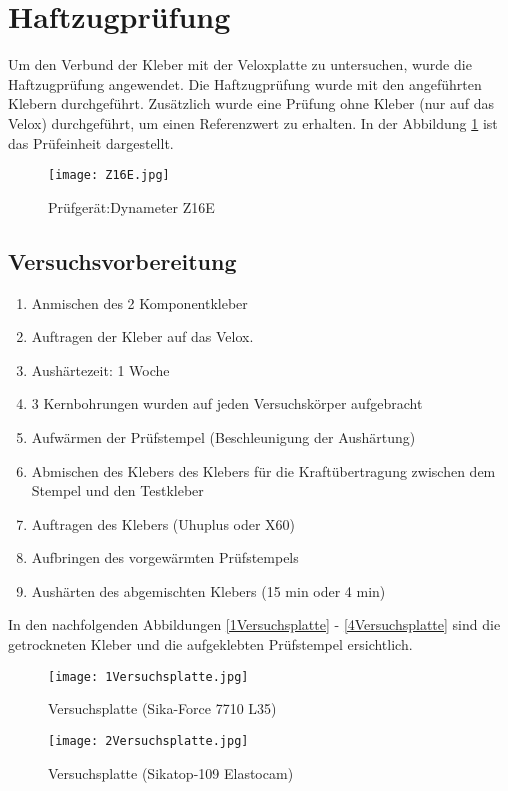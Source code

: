 \documentclass[12 pt,a4 paper ]{scrreprt}
\begin{document}
\section{Haftzugprüfung}
Um den Verbund der Kleber mit der Veloxplatte zu untersuchen, wurde die Haftzugprüfung angewendet.
Die Haftzugprüfung  wurde mit den angeführten Klebern durchgeführt. Zusätzlich wurde eine Prüfung ohne Kleber (nur auf das Velox) durchgeführt, um einen Referenzwert zu erhalten. In der Abbildung \ref{Z16E} ist das Prüfeinheit dargestellt.

\begin{figure}
\begin{center}
\texttt{[image: Z16E.jpg]}
\caption{ Prüfgerät:Dynameter Z16E}
\label{Z16E}
\end{center}
\end{figure}

\newpage{}

\subsection{Versuchsvorbereitung}

\begin{enumerate}
\item Anmischen des 2 Komponentkleber
\item Auftragen der Kleber auf das Velox.
\item Aushärtezeit:  1 Woche
\item 3 Kernbohrungen wurden auf jeden Versuchskörper aufgebracht
\item Aufwärmen der Prüfstempel (Beschleunigung der Aushärtung)
\item Abmischen des Klebers des Klebers für die Kraftübertragung zwischen dem Stempel und den Testkleber
\item Auftragen des Klebers (Uhuplus oder X60)
\item Aufbringen des vorgewärmten Prüfstempels
\item Aushärten des abgemischten Klebers (15 min oder 4 min)
\end{enumerate}

\newpage{}
In den nachfolgenden Abbildungen \ref{1Versuchsplatte} - \ref{4Versuchsplatte} sind die getrockneten Kleber und die aufgeklebten Prüfstempel ersichtlich.

\begin{figure}[h]
\begin{minipage}[hbt]{7cm}	
	\texttt{[image: 1Versuchsplatte.jpg]}
	\caption{Versuchsplatte (Sika-Force 7710 L35)}
	\label{1Versuchsplatte}
\end{minipage}
\hfill
\begin{minipage}[hbt]{7cm}
	\texttt{[image: 2Versuchsplatte.jpg]}
	\caption{Versuchsplatte (Sikatop-109 Elastocam)}
	\label{2Versuchsplatte}
\end{minipage}
\end{figure}
\end{document}
